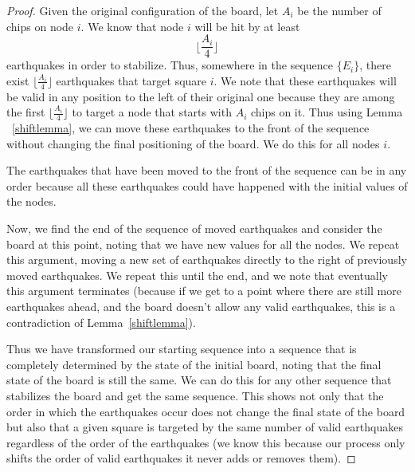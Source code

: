 \documentclass[runningheads,a4paper]{llncs}
\begin{document}
\begin{proof}
Given the original configuration of the board, let $A_i$ be the number of chips on node $i$. We know that node $i$ will be hit by at least 
\begin{equation*}
\lfloor \frac{A_i}{4} \rfloor
\end{equation*}
earthquakes in order to stabilize. Thus, somewhere in the sequence $\{E_i\}$, there exist $\lfloor \frac{A_i}{4} \rfloor$ earthquakes that target  square $i$. We note that these earthquakes will be valid in any position to the left of their original one because they are among the first $\lfloor \frac{A_i}{4} \rfloor$ to target a node that starts with $A_i$ chips on it. Thus using Lemma ~\ref{shiftlemma}, we can move these earthquakes to the front of the sequence without changing the final positioning of the board. We do this for all nodes $i$. 

The earthquakes that have been moved to the front of the sequence can be in any order because all these earthquakes could have happened with the initial values of the nodes. 

Now, we find the end of the sequence of moved earthquakes and consider the board at this point, noting that we have new values for all the nodes. We repeat this argument, moving a new set of earthquakes directly to the right of previously moved earthquakes. We repeat this until the end, and we note that eventually this argument terminates (because if we get to a point where there are still more earthquakes ahead, and the board doesn't allow any valid earthquakes, this is a contradiction of Lemma~\ref{shiftlemma}).

Thus we have transformed our starting sequence into a sequence that is completely determined by the state of the initial board, noting that the final state of the board is still the same. We can do this for any other sequence that stabilizes the board and get the same sequence. This shows not only that the order in which the earthquakes occur does not change the final state of the board but also that a given square is targeted by the same number of valid earthquakes regardless of the order of the earthquakes (we know this because our process only shifts the order of valid earthquakes it never adds or removes them). 
\end{proof}
\end{document}
